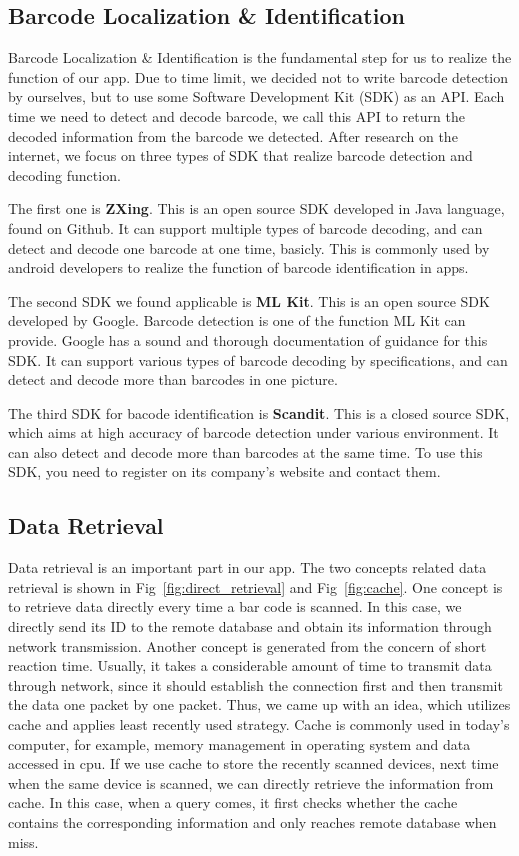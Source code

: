 \documentclass[11pt,a4paper]{article}
\begin{document}
\begin{onehalfspace}
\subsection{Barcode Localization \& Identification}
Barcode Localization \& Identification is the fundamental step for us to realize the function of our app. Due to time limit, we decided not to write barcode detection by ourselves, but to use some Software Development Kit (SDK) as an API. Each time we need to detect and decode barcode, we call this API to return the decoded information from the barcode we detected. After research on the internet, we focus on three types of SDK that realize barcode detection and decoding function.

The first one is \textbf{ZXing}. This is an open source SDK developed in Java language, found on Github. It can support multiple types of barcode decoding, and can detect and decode one barcode at one time, basicly. This is commonly used by android developers to realize the function of barcode identification in apps. 

The second SDK we found applicable is \textbf{ML Kit}. This is an open source SDK developed by Google. Barcode detection is one of the function ML Kit can provide. Google has a sound and thorough documentation of guidance for this SDK. It can support various types of barcode decoding by specifications, and can detect and decode more than barcodes in one picture. 

The third SDK for bacode identification is \textbf{Scandit}. This is a closed source SDK, which aims at high accuracy of barcode detection under various environment. It can also detect and decode more than barcodes at the same time. To use this SDK, you need to register on its company's website and contact them.

\subsection{Data Retrieval}

Data retrieval is an important part in our app. The two concepts related data retrieval is shown in Fig~\ref{fig:direct_retrieval} and Fig~\ref{fig:cache}. One concept is to retrieve data directly every time a bar code is scanned. In this case, we directly send its ID to the remote database and obtain its information through network transmission. Another concept is generated from the concern of short reaction time. Usually, it takes a considerable amount of time to transmit data through network, since it should establish the connection first and then transmit the data one packet by one packet. Thus, we came up with an idea, which utilizes cache and applies least recently used strategy. Cache is commonly used in today's computer, for example, memory management in operating system and data accessed in cpu. If we use cache to store the recently scanned devices, next time when the same device is scanned, we can directly retrieve the information from cache. In this case, when a query comes, it first checks whether the cache contains the corresponding information and only reaches remote database when miss.


\end{onehalfspace}
\end{document}
